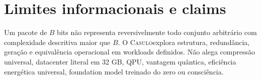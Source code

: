 \documentclass[10pt,a4paper]{article}
\newcommand{\Casulo}{\textsc{Casulo}}
\begin{document}
\section{Limites informacionais e claims}

Um pacote de $B$ bits não representa reversivelmente todo conjunto arbitrário
com complexidade descritiva maior que $B$. O \Casulo explora estrutura,
redundância, geração e equivalência operacional em workloads definidos. Não
alega compressão universal, datacenter literal em 32 GB, QPU, vantagem quântica,
eficiência energética universal, foundation model treinado do zero ou
consciência.
\end{document}
